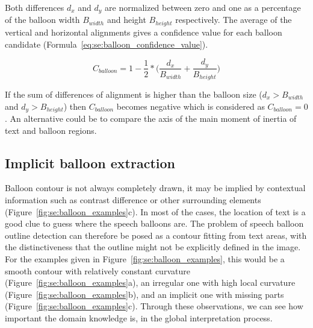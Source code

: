 Both differences $d_x$ and $d_y$ are normalized between zero and one as a percentage of the balloon width $B_{width}$ and height $B_{height}$ respectively.
The average of the vertical and horizontal alignments gives a confidence value for each balloon candidate (Formula~\ref{eq:se:balloon_confidence_value}).


\begin{equation}
	\label{eq:se:balloon_confidence_value}
	C_{balloon} = 1 - \frac{1}{2} *  \bigg( \frac{d_x}{B_{width}} + \frac{d_y}{B_{height}} \bigg)
\end{equation}

If the sum of differences of alignment is higher than the balloon size ($d_x > B_{width}$ and $d_y > B_{height}$) then $C_{balloon}$ becomes negative which is considered as $C_{balloon}=0$.
An alternative could be to compare the axis of the main moment of inertia of text and balloon regions.






\subsection{Implicit balloon extraction} %
\label{sub:se:implicit_balloon_extraction}

Balloon contour is not always completely drawn, it may be implied by contextual information such as contrast difference or other surrounding elements (Figure~\ref{fig:se:balloon_examples}c).
In most of the cases, the location of text is a good clue to guess where the speech balloons are.
The problem of speech balloon outline detection can therefore be posed as a contour fitting from text areas, with the distinctiveness that the outline might not be explicitly defined in the image.
For the examples given in Figure~\ref{fig:se:balloon_examples}, this would be a smooth contour with relatively constant curvature (Figure~\ref{fig:se:balloon_examples}a), an irregular one with high local curvature (Figure~\ref{fig:se:balloon_examples}b), and an implicit one with missing parts (Figure~\ref{fig:se:balloon_examples}c).
Through these observations, we can see how important the domain knowledge is, in the global interpretation process.

